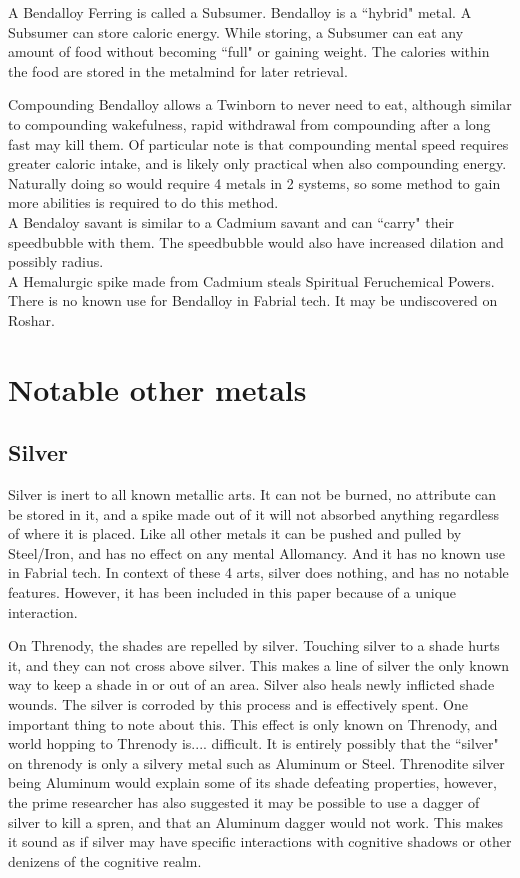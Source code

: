 \documentclass[conference]{IEEEtran}
\begin{document}
A Bendalloy Ferring is called a Subsumer.  Bendalloy is a ``hybrid" metal.  A Subsumer can store caloric energy.  While storing, a Subsumer can eat any amount of food without becoming ``full" or gaining weight.  The calories within the food are stored in the metalmind for later retrieval.

Compounding Bendalloy allows a Twinborn to never need to eat, although similar to compounding wakefulness, rapid withdrawal from compounding after a long fast may kill them.  Of particular note is that compounding mental speed requires greater caloric intake, and is likely only practical when also compounding energy.  Naturally doing so would require 4 metals in 2 systems, so some method to gain more abilities is required to do this method.\\
A Bendaloy savant is similar to a Cadmium savant and can ``carry" their speedbubble with them.  The speedbubble would also have increased dilation and possibly radius.\\

A Hemalurgic spike made from Cadmium steals Spiritual Feruchemical Powers.\\

There is no known use for Bendalloy in Fabrial tech.  It may be undiscovered on Roshar.

\section*{Notable other metals}
\subsection*{Silver}
Silver is inert to all known metallic arts.  It can not be burned, no attribute can be stored in it, and a spike made out of it will not absorbed anything regardless of where it is placed.  Like all other metals it can be pushed and pulled by Steel/Iron, and has no effect on any mental Allomancy.  And it has no known use in Fabrial tech.  In context of these 4 arts, silver does nothing, and has no notable features.  However, it has been included in this paper because of a unique interaction. 

 On Threnody, the shades are repelled by silver.  Touching silver to a shade hurts it, and they can not cross above silver.  This makes a line of silver the only known way to keep a shade in or out of an area.  Silver also heals newly inflicted shade wounds.  The silver is corroded by this process and is effectively spent.  
One important thing to note about this.  This effect is only known on Threnody, and world hopping to Threnody is.... difficult.  It is entirely possibly that the ``silver" on threnody is only a silvery metal such as Aluminum or Steel.  Threnodite silver being Aluminum would explain some of its shade defeating properties, however, the prime researcher has also suggested it may be possible to use a dagger of silver to kill a spren, and that an Aluminum dagger would not work.  This makes it sound as if silver may have specific interactions with cognitive shadows or other denizens of the cognitive realm.
\end{document}
